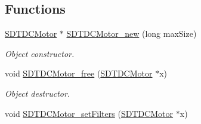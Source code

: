 \subsection*{Functions}
\begin{DoxyCompactItemize}
\item 
\hyperlink{group__dcmotor_ga55042fc98f1704ef2f8dd270e90c4cef}{S\+D\+T\+D\+C\+Motor} $\ast$ \hyperlink{group__dcmotor_gaad3570a8a5707025e7ca299b8c47dded}{S\+D\+T\+D\+C\+Motor\+\_\+new} (long max\+Size)
\begin{DoxyCompactList}\small\item\em Object constructor. \end{DoxyCompactList}\item 
void \hyperlink{group__dcmotor_gacd8bb9c4aa4b25de0682e7adc7e1795b}{S\+D\+T\+D\+C\+Motor\+\_\+free} (\hyperlink{group__dcmotor_ga55042fc98f1704ef2f8dd270e90c4cef}{S\+D\+T\+D\+C\+Motor} $\ast$x)
\begin{DoxyCompactList}\small\item\em Object destructor. \end{DoxyCompactList}\item 
\hypertarget{group__dcmotor_ga8fac279ba4d3ea254f7855e26d826fbf}{}void \hyperlink{group__dcmotor_ga8fac279ba4d3ea254f7855e26d826fbf}{S\+D\+T\+D\+C\+Motor\+\_\+set\+Filters} (\hyperlink{group__dcmotor_ga55042fc98f1704ef2f8dd270e90c4cef}{S\+D\+T\+D\+C\+Motor} $\ast$x)\label{group__dcmotor_ga8fac279ba4d3ea254f7855e26d826fbf}


\end{DoxyCompactItemize}
